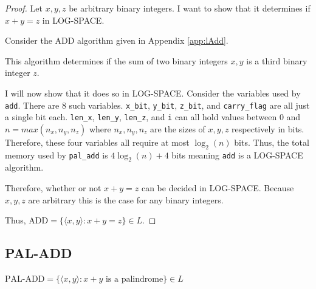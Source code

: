 \documentclass[11pt, a4paper]{article}
\begin{document}
\begin{proof}
    Let \(x, y, z\) be arbitrary binary integers.
    I want to show that it determines if \(x + y = z\) in LOG-SPACE.

    Consider the ADD algorithm given in Appendix \ref{app:lAdd}.

    This algorithm determines if the sum of two binary integers \(x, y\) is a third binary integer \(z\).

    I will now show that it does so in LOG-SPACE.
    Consider the variables used by \lstinline|add|.
    There are \(8\) such variables.
    \lstinline|x_bit|, \lstinline|y_bit|, \lstinline|z_bit|, and \lstinline|carry_flag| are all just a single bit each.
    \lstinline|len_x|, \lstinline|len_y|, \lstinline|len_z|, and \lstinline|i| can all hold values between \(0\) and \(n = max(n_x, n_y, n_z)\) where \(n_x, n_y, n_z\) are the sizes of \(x, y, z\) respectively in bits.
    Therefore, these four variables all require at most \(\log_2(n)\) bits.
    Thus, the total memory used by \lstinline|pal_add| is \(4\log_2(n) + 4\) bits meaning \lstinline|add| is a LOG-SPACE algorithm.

    Therefore, whether or not \(x + y = z\) can be decided in LOG-SPACE.
    Because \(x, y, z\) are arbitrary this is the case for any binary integers.
    
    Thus, \(\text{ADD} = \{\langle x, y \rangle : x + y = z\} \in L\).
\end{proof}

\subsection{PAL-ADD}

\begin{theorem}
    \(\text{PAL-ADD} = \{\langle x, y \rangle : x + y \text{ is a palindrome}\} \in L\)
\end{theorem}
\end{document}
